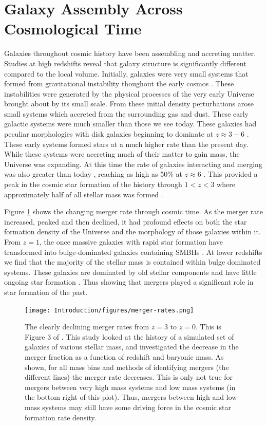 \section{Galaxy Assembly Across Cosmological Time}
\noindent Galaxies throughout cosmic history have been assembling and accreting matter. Studies at high redshifts reveal that galaxy structure is significantly different compared to the local volume. Initially, galaxies were very small systems that formed from gravitational instability thoughout the early cosmos \citep{1993MNRAS.262..627L}. These instabilities were generated by the physical processes of the very early Universe brought about by its small scale. From these initial density perturbations arose small systems which accreted from the surrounding gas and dust. These early galactic systems were much smaller than those we see today. These galaxies had peculiar morphologies \citep{2005ApJ...627..632E} with disk galaxies beginning to dominate at $z\approx3 - 6$ \citep{2022ApJ...938L...2F}. These early systems formed stars at a much higher rate than the present day. While these systems were accreting much of their matter to gain mass, the Universe was expanding. At this time the rate of galaxies interacting and merging was also greater than today \citep{2010ApJ...715..202H, 2011ApJ...742..103L}, reaching as high as 50\% at $z\approx6$ \citep{2009MNRAS.397..208C, 2009MNRAS.394L..51B}. This provided a peak in the cosmic star formation of the history through $1 < z < 3$ where approximately half of all stellar mass was formed \citep{2005ApJ...625..621B}.

Figure \ref{fig:merger-rate} shows the changing merger rate through cosmic time. As the merger rate increased, peaked and then declined, it had profound effects on both the star formation density of the Universe and the morphology of those galaxies within it. From $z = 1$, the once massive galaxies with rapid star formation have transformed into bulge-dominated galaxies containing SMBHs \citep{2007ApJ...654..858B}. At lower redshifts we find that the majority of the stellar mass is contained within bulge dominated systems. These galaxies are dominated by old stellar components and have little ongoing star formation \citep{2002AJ....124..646H, 2004ApJ...608..752B}. Thus showing that mergers played a significant role in star formation of the past. 

\begin{figure}
\centering
\texttt{[image: Introduction/figures/merger-rates.png]}
\caption[The declining merger rates from z = 3 to z = 0.]{The clearly declining merger rates from $z = 3$ to $z = 0$. This is Figure 3 of \citet{2010ApJ...715..202H}. This study looked at the history of a simulated set of galaxies of various stellar mass, and investigated the decrease in the merger fraction as a function of redshift and baryonic mass. As shown, for all mass bins and methods of identifying mergers (the different lines) the merger rate decreases. This is only not true for mergers between very high mass systems and low mass systems (in the bottom right of this plot). Thus, mergers between high and low mass systems may still have some driving force in the cosmic star formation rate density.}
\label{fig:merger-rate}
\end{figure}

